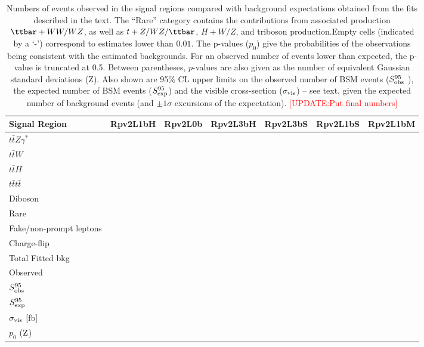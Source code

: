 \begin{table}
\begin{center}
\begin{tabular}{|l|r|r|r|r|r|r|}
\hline
Signal Region & {\bf Rpv2L1bH } & {\bf Rpv2L0b } & {\bf Rpv2L3bH } & {\bf Rpv2L3bS } & {\bf Rpv2L1bS }  & {\bf Rpv2L1bM  } \\
\hline
\hline
$t\bar{t}Z\gamma^*$      &        &        &        &        &   &        \\
$t\bar{t}W$              &        &        &        &        &   &        \\
$t\bar{t}H$              &        &        &        &        &   &        \\
$t\bar{t}t\bar{t}$       &        &        &        &        &   &        \\
Diboson                  &        &        &        &        &   &        \\
Rare                     &        &        &        &        &   &        \\
Fake/non-prompt leptons  &        &        &        &        &   &        \\
Charge-flip              &        &        &        &        &   &        \\	
\hline
Total Fitted bkg         &        &        &        &        &   &        \\
\hline
Observed                 &        &        &        &        &   &        \\
\hline
$S_{\rm obs}^{95}$       &	  &	   &	    &	     &   &	 \\
$S_{\rm exp}^{95}$       &	  &	   &	    &	     &   &	 \\
$\sigma_{\rm{vis}}$ [fb] &        &        &        &        &   &       \\
$p_{0}$ ($\rm Z$)        &        &        &        &        &   &       \\
\hline 
\end{tabular}

\vspace*{1cm}

\vspace*{-0.01\textheight}\caption[p0 and UL]{Numbers of events observed in the signal regions compared with background expectations 
obtained from the fits described in the text. The ``Rare'' category contains the contributions from associated 
production $\ttbar+WW/WZ$, as well as $t+Z/WZ/\ttbar$, $H+W/Z$, and triboson production.Empty cells (indicated by a `-') 
correspond to estimates lower than $0.01$. The p-values ($p_{0}$) give the probabilities of the observations being consistent 
with the estimated backgrounds. For an observed number of events lower than expected, the p-value is truncated at 0.5. Between 
parentheses, $p$-values are also given as the number of equivalent Gaussian standard deviations (Z).
Also shown are 95\% CL upper limits on the observed number of BSM events ($S_{\rm obs}^{95}$ ), the expected number of BSM events ($S_{\rm exp}^{95}$) and
the visible cross-section ($\sigma_{\rm{vis}}$) -- see text, given the expected number of background events (and $\pm 1\sigma$ excursions of the expectation). 
\textcolor{red}{[UPDATE:Put final numbers]}}
\label{tab:SR_yields}
\end{center}
\end{table}


